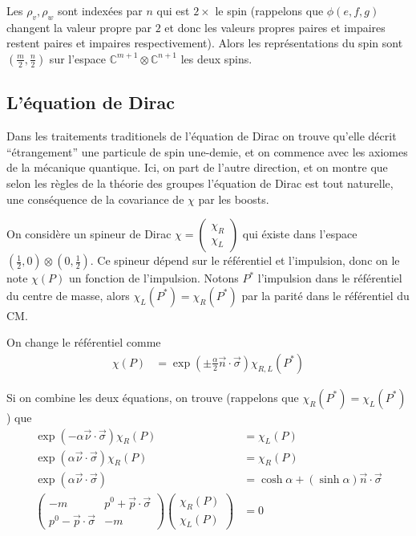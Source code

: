 \documentclass[10pt]{report}
\begin{document}
Les $\rho_v, \rho_w$ sont index\'ees par $n$ qui est $2\times$ le spin (rappelons que $\phi(e,f,g)$ changent la valeur propre par $2$ et donc les valeurs propres paires et impaires restent paires et impaires respectivement). Alors les repr\'esentations du spin sont $\left( \frac{m}{2}, \frac{n}{2} \right)$ sur l'espace $\mathbb{C}^{m+1} \otimes \mathbb{C}^{n+1}$ les deux spins.

\subsection{L'\'equation de Dirac}

Dans les traitements traditionels de l'\'equation de Dirac on trouve qu'elle d\'ecrit ``\'etrangement'' une particule de spin une-demie, et on commence avec les axiomes de la m\'ecanique quantique. Ici, on part de l'autre direction, et on montre que selon les r\`egles de la th\'eorie des groupes l'\'equation de Dirac est tout naturelle, une cons\'equence de la covariance de $\chi$ par les boosts.

On consid\`ere un spineur de Dirac $\chi = \begin{pmatrix} \chi_R\\ \chi_L \end{pmatrix} $ qui \'existe dans l'espace $\left( \frac{1}{2},0 \right)\otimes \left( 0, \frac{1}{2} \right)$. Ce spineur d\'epend sur le r\'ef\'erentiel et l'impulsion, donc on le note $\chi(P)$ un fonction de l'impulsion. Notons $P^*$ l'impulsion dans le r\'ef\'erentiel du centre de masse, alors $\chi_L(P^*) = \chi_R(P^*)$ par la parit\'e dans le r\'ef\'erentiel du CM.

On change le r\'ef\'erentiel comme
\begin{align}
    \chi(P) &= \exp\left( \pm \frac{\alpha}{2}\vec{n} \cdot \vec{\sigma} \right)\chi_{R,L}(P^*)
\end{align}

Si on combine les deux \'equations, on trouve (rappelons que $\chi_R(P^*) = \chi_L(P^*)$) que
\begin{align}
    \exp\left( -\alpha \vec{\nu} \cdot \vec{\sigma} \right)\chi_R(P) &= \chi_L(P)\\
    \exp\left( \alpha \vec{\nu} \cdot \vec{\sigma} \right)\chi_R(P) &= \chi_R(P)\\
    \exp\left( \alpha \vec{\nu} \cdot \vec{\sigma} \right) &= \cosh \alpha + (\sinh\alpha) \vec{n} \cdot \vec{\sigma}\\
    \begin{pmatrix} -m & p^0 + \vec{p} \cdot \vec{\sigma}\\
        p^0 - \vec{p} \cdot \vec{\sigma} & -m\end{pmatrix} \begin{pmatrix} \chi_R(P)\\ \chi_L(P) \end{pmatrix}  &= 0
\end{align}
\end{document}

